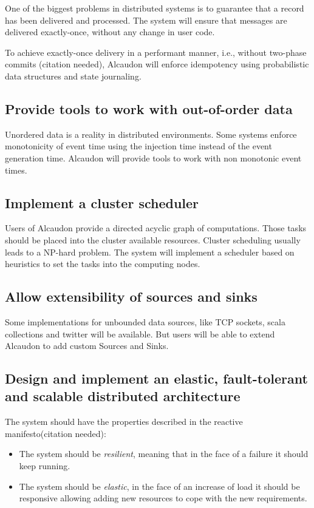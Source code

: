 One of the biggest problems in distributed systems is to guarantee that a record
has been delivered and processed. The system will ensure that messages are
delivered exactly-once, without any change in user code.

To achieve exactly-once delivery in a performant manner, i.e., without two-phase
commits (citation needed), Alcaudon will enforce idempotency using probabilistic
data structures and state journaling.

\subsection{Provide tools to work with out-of-order data}

Unordered data is a reality in distributed environments. Some systems enforce
monotonicity of event time using the injection time instead of the event
generation time. Alcaudon will provide tools to work with non monotonic event
times.

\subsection{Implement a cluster scheduler}

Users of Alcaudon provide a directed acyclic graph of computations. Those
tasks should be placed into the cluster available resources. Cluster scheduling
usually leads to a NP-hard problem. The system will implement a scheduler based
on heuristics to set the tasks into the computing nodes.


\subsection{Allow extensibility of sources and sinks}
Some implementations for unbounded data sources, like TCP sockets, scala collections
and twitter will be available. But users will be able to extend Alcaudon to add
custom Sources and Sinks.

\subsection{Design and implement an elastic, fault-tolerant and scalable distributed architecture}
The system should have the properties described in the reactive manifesto(citation needed):

\begin{itemize}
  \item The system should be \textit{resilient}, meaning that in the face of a failure it should keep running.
  \item The system should be \textit{elastic}, in the face of an increase of load it
    should be responsive allowing adding new resources to cope with the new
    requirements.
\end{itemize}

